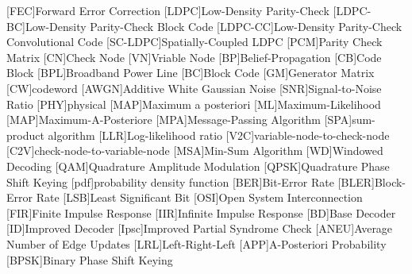 \begin{acronym}
  [FEC]{Forward Error Correction}
  [LDPC]{Low-Density Parity-Check}
  [LDPC-BC]{Low-Density Parity-Check Block Code}
  [LDPC-CC]{Low-Density Parity-Check Convolutional Code}
  [SC-LDPC]{Spatially-Coupled LDPC}
  [PCM]{Parity Check Matrix}
  [CN]{Check Node}
  [VN]{Vriable Node}
  [BP]{Belief-Propagation}
  [CB]{Code Block}
  [BPL]{Broadband Power Line}
  [BC]{Block Code}
  [GM]{Generator Matrix}
  [CW]{codeword}
  [AWGN]{Additive White Gaussian Noise}
  [SNR]{Signal-to-Noise Ratio}
  [PHY]{physical}
  [MAP]{Maximum a posteriori}
  [ML]{Maximum-Likelihood}
  [MAP]{Maximum-A-Posteriore}
  [MPA]{Message-Passing Algorithm}
  [SPA]{sum-product algorithm}
  [LLR]{Log-likelihood ratio}
  [V2C]{variable-node-to-check-node}
  [C2V]{check-node-to-variable-node}
  [MSA]{Min-Sum Algorithm}
  [WD]{Windowed Decoding}
  [QAM]{Quadrature Amplitude Modulation}
  [QPSK]{Quadrature Phase Shift Keying}
  [pdf]{probability density function}
  [BER]{Bit-Error Rate}
  [BLER]{Block-Error Rate}
  [LSB]{Least Significant Bit}
  [OSI]{Open System Interconnection}
  [FIR]{Finite Impulse Response}
  [IIR]{Infinite Impulse Response}
  [BD]{Base Decoder}
  [ID]{Improved Decoder}
  [Ipsc]{Improved Partial Syndrome Check}
  [ANEU]{Average Number of Edge Updates}
  [LRL]{Left-Right-Left}
  [APP]{A-Posteriori Probability}
  [BPSK]{Binary Phase Shift Keying}
\end{acronym}